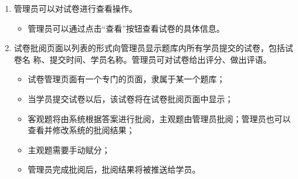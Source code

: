 \documentclass{article}
\begin{document}
\begin{enumerate}
        \item 管理员可以对试卷进行查看操作。
        \begin{itemize}
            \item 管理员可以通过点击“查看”按钮查看试卷的具体信息。
        \end{itemize}
        \item 试卷批阅页面以列表的形式向管理员显示题库内所有学员提交的试卷，包括试卷名 称、提交时间、学员名称。管理员可对试卷给出评分、做出评语。
        \begin{itemize}
            \item 试卷管理页面有一个专门的页面，隶属于某一个题库；
            \item 当学员提交试卷以后，该试卷将在试卷批阅页面中显示；
            \item 客观题将由系统根据答案进行批阅，主观题由管理员批阅；管理员也可以查看并修改系统的批阅结果；
            \item 主观题需要手动赋分；
            \item 管理员完成批阅后，批阅结果将被推送给学员。
        \end{itemize}
    \end{enumerate}
\end{document}
